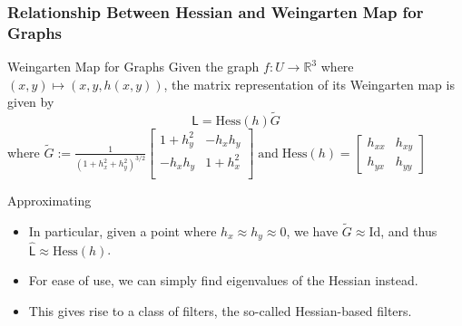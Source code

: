 \documentclass[9pt]{beamer}
\newcommand{\Hess}{\mathrm{Hess}} %
\begin{document}
\begin{frame}
\frametitle{Relationship Between Hessian and Weingarten Map for Graphs}
    \begin{block}{Weingarten Map for Graphs}
    Given the graph $f: U \to \mathbb{R}^3$ where $(x,y) \mapsto (x, y, h(x,y))$, the matrix
    representation of its Weingarten map is given by
    \begin{equation*}
    \widehat{\mathsf{L}} = \mathrm{Hess}(h) \tilde{G}
    \end{equation*}
    where
    $
    \tilde{G} := \frac{1}{\left({1+h_x^2 + h_y^2}\right)^{3/2}}   
    \begin{bmatrix}
    1+h_y^2 & -h_x h_y \\
    -h_x h_y & 1 + h_x^2 \\
    \end{bmatrix}
    \;\text{and}\; \Hess(h) = \begin{bmatrix} h_{xx} & h_{xy} \\ h_{yx} & h_{yy} \end{bmatrix}
    $
  \end{block}
  \begin{block}{Approximating}
    \begin{itemize}
    \item In particular, given a point where $h_x \approx h_y \approx 0$, we
      have $\tilde{G} \approx \mathrm{Id}$, and thus
      $\widehat{\mathsf{L}} \approx \mathrm{Hess}(h)$.
    \item For ease of use, we can simply find eigenvalues of the Hessian instead.
    \item This gives rise to a class of filters, the so-called Hessian-based filters.
    \end{itemize}
  \end{block}
\end{frame}
\end{document}
